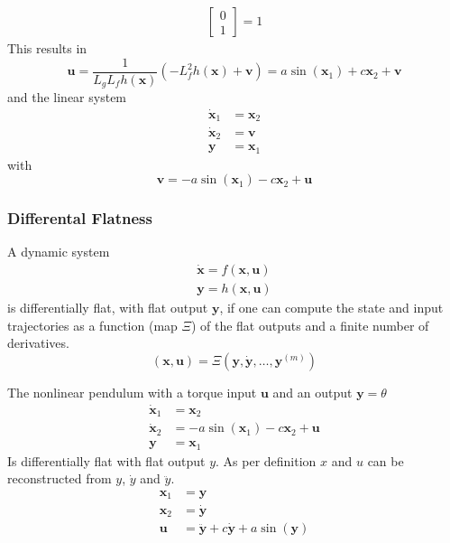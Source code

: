 \begin{examplesection}[Pendulum]
\begin{align*}
\begin{bmatrix}
            0 \\
            1
        \end{bmatrix} = 1
    \end{align*}
    This results in
    \begin{equation*}
        \mathbf{u} = \frac{1}{L_g L_f h(\mathbf{x})}(-L_f^2 h(\mathbf{x}) + \mathbf{v}) = a \sin(\mathbf{x}_1) + c \mathbf{x}_2 + \mathbf{v}
    \end{equation*}
    and the linear system
    \begin{align*}
        \dot{\mathbf{x}}_1 & = \mathbf{x}_2 \\
        \dot{\mathbf{x}}_2 & = \mathbf{v}   \\
        \mathbf{y}         & = \mathbf{x}_1
    \end{align*}
    with
    \begin{equation*}
        \mathbf{v} = -a \sin(\mathbf{x}_1)-c \mathbf{x}_2 + \mathbf{u}
    \end{equation*}
\end{examplesection}

\subsubsection{Differental Flatness}\label{diff_flatness}
A dynamic system
\begin{gather*}
    \dot{\mathbf{x}} = f(\mathbf{x},\mathbf{u}) \\
    \mathbf{y} = h(\mathbf{x},\mathbf{u})
\end{gather*}
is differentially flat, with flat output $\mathbf{y}$, if one can compute the state and input trajectories as a function (map $\Xi$) of the flat outputs and a finite number of derivatives.
\begin{equation*}
    (\mathbf{x},\mathbf{u}) = \Xi (\mathbf{y},\dot{\mathbf{y}}, \ldots, \mathbf{y}^{(m)})
\end{equation*}

\begin{examplesection}[Pendulum]
    The nonlinear pendulum with a torque input $\mathbf{u}$ and an output $\mathbf{y}=\theta$
    \begin{align*}
        \dot{\mathbf{x}}_1 & = \mathbf{x}_2                                      \\
        \dot{\mathbf{x}}_2 & = -a \sin(\mathbf{x}_1)-c \mathbf{x}_2 + \mathbf{u} \\
        \mathbf{y}         & = \mathbf{x}_1
    \end{align*}
    Is differentially flat with flat output $y$. As per definition $x$ and $u$ can be reconstructed from $y$, $\dot{y}$ and $\ddot{y}$.
    \begin{align*}
        \mathbf{x}_1 & = \mathbf{y}                                                  \\
        \mathbf{x}_2 & = \dot{\mathbf{y}}                                            \\
        \mathbf{u}   & = \ddot{\mathbf{y}} + c \dot{\mathbf{y}} + a \sin(\mathbf{y})
    \end{align*}
\end{examplesection}

